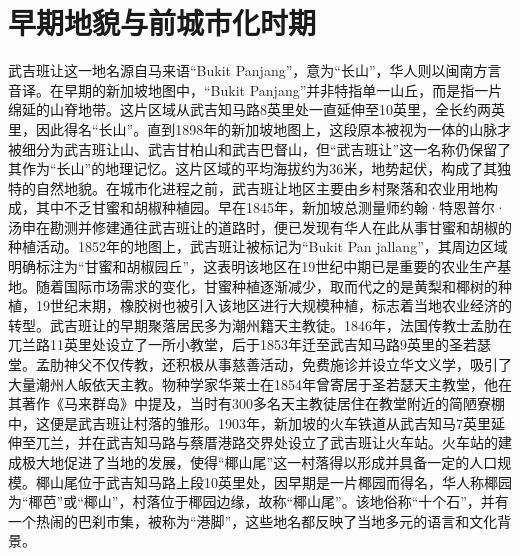 \documentclass[11pt,a4paper,twoside,openany]{book}
\begin{document}
\section{早期地貌与前城市化时期}
武吉班让这一地名源自马来语“Bukit Panjang”，意为“长山”，华人则以闽南方言音译。在早期的新加坡地图中，“Bukit Panjang”并非特指单一山丘，而是指一片绵延的山脊地带。这片区域从武吉知马路8英里处一直延伸至10英里，全长约两英里，因此得名“长山”。直到1898年的新加坡地图上，这段原本被视为一体的山脉才被细分为武吉班让山、武吉甘柏山和武吉巴督山，但“武吉班让”这一名称仍保留了其作为“长山”的地理记忆。这片区域的平均海拔约为36米，地势起伏，构成了其独特的自然地貌。在城市化进程之前，武吉班让地区主要由乡村聚落和农业用地构成，其中不乏甘蜜和胡椒种植园。早在1845年，新加坡总测量师约翰·特恩普尔·汤申在勘测并修建通往武吉班让的道路时，便已发现有华人在此从事甘蜜和胡椒的种植活动。1852年的地图上，武吉班让被标记为“Bukit Pan jallang”，其周边区域明确标注为“甘蜜和胡椒园丘”，这表明该地区在19世纪中期已是重要的农业生产基地。随着国际市场需求的变化，甘蜜种植逐渐减少，取而代之的是黄梨和椰树的种植，19世纪末期，橡胶树也被引入该地区进行大规模种植，标志着当地农业经济的转型。武吉班让的早期聚落居民多为潮州籍天主教徒。1846年，法国传教士孟肋在兀兰路11英里处设立了一所小教堂，后于1853年迁至武吉知马路9英里的圣若瑟堂。孟肋神父不仅传教，还积极从事慈善活动，免费施诊并设立华文义学，吸引了大量潮州人皈依天主教。物种学家华莱士在1854年曾寄居于圣若瑟天主教堂，他在其著作《马来群岛》中提及，当时有300多名天主教徒居住在教堂附近的简陋寮棚中，这便是武吉班让村落的雏形。1903年，新加坡的火车铁道从武吉知马7英里延伸至兀兰，并在武吉知马路与蔡厝港路交界处设立了武吉班让火车站。火车站的建成极大地促进了当地的发展，使得“椰山尾”这一村落得以形成并具备一定的人口规模。椰山尾位于武吉知马路上段10英里处，因早期是一片椰园而得名，华人称椰园为“椰芭”或“椰山”，村落位于椰园边缘，故称“椰山尾”。该地俗称“十个石”，并有一个热闹的巴刹市集，被称为“港脚”，这些地名都反映了当地多元的语言和文化背景。
\end{document}
